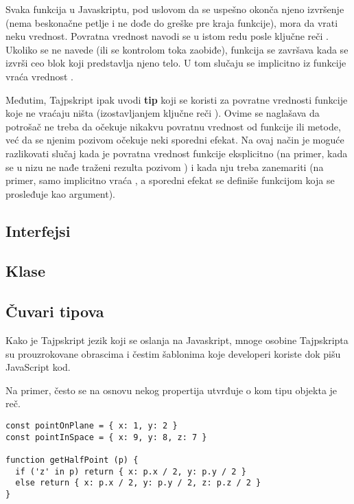 Svaka funkcija u Javaskriptu, pod uslovom da se uspešno okonča njeno izvršenje (nema beskonačne petlje i ne dođe do greške pre kraja funkcije), mora da vrati neku vrednost.
Povratna vrednost navodi se u istom redu posle ključne reči .
Ukoliko se  ne navede (ili se kontrolom toka zaobiđe), funkcija se završava kada se izvrši ceo blok koji predstavlja njeno telo.
U tom slučaju se implicitno iz funkcije vraća vrednost .

Međutim, Tajpskript ipak uvodi \textbf{tip } koji se koristi za povratne vrednosti funkcije koje ne vraćaju ništa (izostavljanjem ključne reči ).
Ovime se naglašava da potrošač ne treba da očekuje nikakvu povratnu vrednost od funkcije ili metode, već da se njenim pozivom očekuje neki sporedni efekat.
Na ovaj način je moguće razlikovati slučaj kada je povratna vrednost funkcije eksplicitno  (na primer, kada se u nizu ne nađe traženi rezulta pozivom ) i kada nju treba zanemariti (na primer,  samo implicitno vraća , a sporedni efekat se definiše funkcijom koja se prosleđuje kao argument).

\subsection{Interfejsi}


\subsection{Klase}

\subsection{Čuvari tipova}

Kako je Tajpskript jezik koji se oslanja na Javaskript, mnoge osobine Tajpskripta su prouzrokovane obrascima i čestim šablonima koje developeri koriste dok pišu JavaScript kod.

Na primer, često se na osnovu nekog propertija utvrđuje o kom tipu objekta je reč.

\begin{verbatim}
const pointOnPlane = { x: 1, y: 2 }
const pointInSpace = { x: 9, y: 8, z: 7 }

function getHalfPoint (p) {
  if ('z' in p) return { x: p.x / 2, y: p.y / 2 }
  else return { x: p.x / 2, y: p.y / 2, z: p.z / 2 }
}
\end{verbatim}

